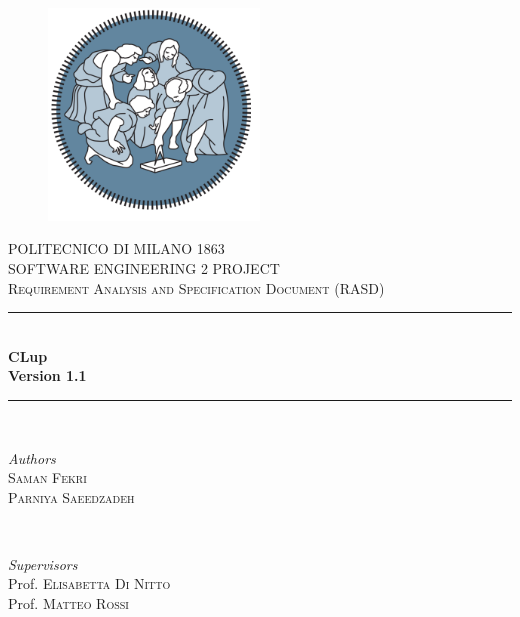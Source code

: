 \begin{titlepage}

	\center %

    \begin{figure}[H]
      \centering
      \includegraphics[width=0.5\textwidth,keepaspectratio]{images/PolimiLogo1.png}
    \end{figure}
    
	\textsc{\LARGE POLITECNICO DI MILANO 1863}\\[2cm]

	\textsc{\Large SOFTWARE ENGINEERING 2 PROJECT }\\[0.5cm]

	\textsc{\large Requirement Analysis and Specification Document (RASD)}\\[0.5cm]
	
	\rule{\linewidth}{0.5mm}\\[0.4cm]
	{\huge\bfseries CLup}\\[0.4cm]
	\textbf{Version 1.1}\\

	\rule{\linewidth}{0.5mm}\\[1.5cm]

	\begin{minipage}{0.4\textwidth}
		\begin{flushleft}
			\large
			\textit{Authors}\\
			 \textsc{Saman Fekri} \\
			 \textsc{Parniya Saeedzadeh}
		\end{flushleft}
	\end{minipage}
	~
	\begin{minipage}{0.5\textwidth}
		\begin{flushright}
			\large
			\textit{Supervisors}\\
			Prof. \textsc {Elisabetta Di Nitto}\\
			Prof. \textsc {Matteo Rossi}
		\end{flushright}
	\end{minipage}
	

\end{titlepage}
